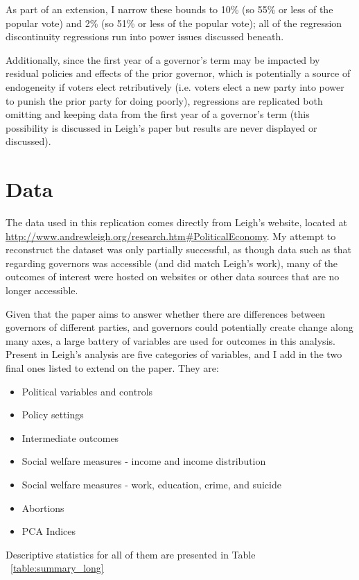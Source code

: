 \documentclass{article}
\begin{document}
As part of an extension, I narrow these bounds to 10\% (so 55\% or less of the popular vote) and 2\% (so 51\% or less of the popular vote); all of the regression discontinuity regressions run into power issues discussed beneath.

Additionally, since the first year of a governor's term may be impacted by residual policies and effects of the prior governor, which is potentially a source of endogeneity if voters elect retributively (i.e. voters elect a new party into power to punish the prior party for doing poorly), regressions are replicated both omitting and keeping data from the first year of a governor's term (this possibility is discussed in Leigh's paper but results are never displayed or discussed).


\section{Data}

The data used in this replication comes directly from Leigh's website, located at \url{http://www.andrewleigh.org/research.htm#PoliticalEconomy}. My attempt to reconstruct the dataset was only partially successful, as though data such as that regarding governors was accessible (and did match Leigh's work), many of the outcomes of interest were hosted on websites or other data sources that are no longer accessible.

Given that the paper aims to answer whether there are differences between governors of different parties, and governors could potentially create change along many axes, a large battery of variables are used for outcomes in this analysis. Present in Leigh's analysis are five categories of variables, and I add in the two final ones listed to extend on the paper. They are:
\begin{itemize}
\item Political variables and controls
\item Policy settings
\item Intermediate outcomes
\item Social welfare measures - income and income distribution
\item Social welfare measures - work, education, crime, and suicide
\item Abortions
\item PCA Indices
\end{itemize}

Descriptive statistics for all of them are presented in Table ~\ref{table:summary_long}
\end{document}
